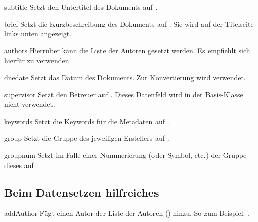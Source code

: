 \documentclass[useartcl,notoc]{sopra-paper}
\begin{document}
\begin{command}{subtitle}{}
    Setzt den Untertitel des Dokuments auf .
\end{command}

\begin{command}{brief}{}
    Setzt die Kurzbeschreibung des Dokuments auf . Sie wird auf der Titelseite links unten angezeigt.
\end{command}

\begin{command}{authors}{}
    Hierrüber kann die Liste der Autoren gesetzt werden. Es empfiehlt sich
    hierfür  zu verwenden.
\end{command}

\begin{command}{duedate}{}
   Setzt das Datum des Dokuments. Zur Konvertierung wird 
   verwendet.
\end{command}

\begin{command}{supervisor}{}
    Setzt den Betreuer auf . Dieses Datenfeld wird in der Basis-Klasse nicht verwendet.
\end{command}

\begin{command}{keywords}{}
    Setzt die Keywords für die Metadaten auf .
\end{command}

\begin{command}{group}{}
    Setzt die Gruppe des jeweiligen Erstellers auf .%
\end{command}

\begin{command}{groupnum}{}
    Setzt im Falle einer Nummerierung (oder Symbol, etc.) der Gruppe dieses
    auf .
\end{command}

\subsection{Beim Datensetzen hilfreiches}
\begin{command}{addAuthor}{}
    Fügt einen Autor der Liste der Autoren () hinzu. So zum
    Beispiel: .
\end{command}
\end{document}
